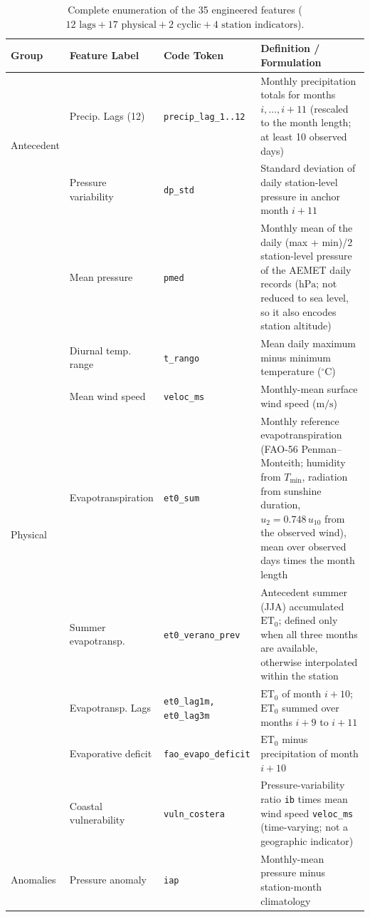 \documentclass[11pt,a4paper]{article}
\begin{document}
\begin{table}[htbp]
\centering
\caption{Complete enumeration of the 35 engineered features ($12 \text{ lags} + 17 \text{ physical} + 2 \text{ cyclic} + 4 \text{ station indicators}$).}
\label{tab:glossary}
{\footnotesize{}
\begin{tabularx}{\textwidth}{lllX}
\toprule
\textbf{Group} & \textbf{Feature Label} & \textbf{Code Token} & \textbf{Definition / Formulation} \\
\midrule
\multirow{2}{*}{Antecedent} & Precip. Lags (12) & \texttt{precip\_lag\_1..12} & Monthly precipitation totals for months $i, \dots, i+11$ (rescaled to the month length; at least 10 observed days) \\
& Pressure variability & \texttt{dp\_std} & Standard deviation of daily station-level pressure in anchor month $i+11$ \\
\midrule
\multirow{8}{*}{Physical} & Mean pressure & \texttt{pmed} & Monthly mean of the daily (max + min)/2 station-level pressure of the AEMET daily records ($\mathrm{hPa}$; not reduced to sea level, so it also encodes station altitude) \\
& Diurnal temp. range & \texttt{t\_rango} & Mean daily maximum minus minimum temperature ($^\circ\mathrm{C}$) \\
& Mean wind speed & \texttt{veloc\_ms} & Monthly-mean surface wind speed ($\mathrm{m/s}$) \\
& Evapotranspiration & \texttt{et0\_sum} & Monthly reference evapotranspiration (FAO-56 Penman--Monteith; humidity from $T_{\min}$, radiation from sunshine duration, $u_2=0.748\,u_{10}$ from the observed wind), mean over observed days times the month length \\
& Summer evapotransp. & \texttt{et0\_verano\_prev} & Antecedent summer (JJA) accumulated $\text{ET}_0$; defined only when all three months are available, otherwise interpolated within the station \\
& Evapotransp. Lags & \texttt{et0\_lag1m, et0\_lag3m} & $\text{ET}_0$ of month $i+10$; $\text{ET}_0$ summed over months $i+9$ to $i+11$ \\
& Evaporative deficit & \texttt{fao\_evapo\_deficit} & $\text{ET}_0$ minus precipitation of month $i+10$ \\
& Coastal vulnerability & \texttt{vuln\_costera} & Pressure-variability ratio \texttt{ib} times mean wind speed \texttt{veloc\_ms} (time-varying; not a geographic indicator) \\
\midrule
\multirow{3}{*}{Anomalies} & Pressure anomaly & \texttt{iap} & Monthly-mean pressure minus station-month climatology \\

\end{tabularx}}
\end{table}
\end{document}
